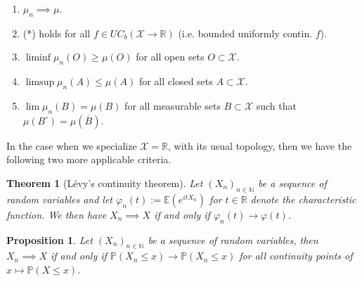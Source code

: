 \documentclass[11pt,a4paper, final]{article}
\newtheorem{thm}{Theorem}[section]
\newtheorem{prop}{Proposition}[section]
\theoremstyle{definition}
\begin{document}
\begin{enumerate}
\item $\mu_n \implies \mu$.
\item (*) holds for all $f \in UC_b( \mathcal{X} \to \mathbb{R})$ (i.e. bounded uniformly contin. $f$).
\item $\liminf \mu_n(O) \geq \mu (O)$ for all open sets $O \subset \mathcal{X}$. 
\item $\limsup \mu_n(A) \leq \mu (A)$ for all closed sets $A \subset \mathcal{X}$. 
\item $\lim \mu_n(B) = \mu(B)$ for all measurable sets $B \subset \mathcal{X}$ such that $\mu(B^\circ)= \mu( \overline{B})$. 
\end{enumerate}
\noindent In the case when we specialize $\mathcal{X}= \mathbb{R}$, with its usual topology, then we have the following two more applicable criteria. 
\begin{thm}[Lévy's continuity theorem] Let $(X_n)_{n \in \mathbb{N}}$ be a sequence of random variables and let $\varphi_n(t):= \mathbb{E}(e^{itX_n})$ for $t \in \mathbb{R}$ denote the characteristic function. We then have $X_n \implies X$ if and only if $\varphi_n(t) \to \varphi(t)$. 

\end{thm}
\begin{prop} Let $(X_n)_{n \in \mathbb{N}}$ be a sequence of random variables, then $X_n \implies X$ if and only if $\mathbb{P}(X_n \leq x) \to \mathbb{P}(X_n \leq x)$ for all continuity points of $x \mapsto \mathbb{P}(X \leq x)$. 

\end{prop}

\newpage
\end{document}
